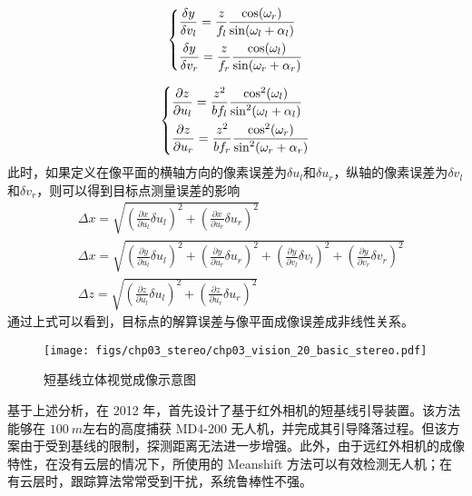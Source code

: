\begin{equation}
\left\{ \begin{gathered}
\frac{{\delta y}}{{\delta {v_l}}} = \frac{z}{{{f_l}}}\frac{{\cos ({\omega _r})}}{{\sin ({\omega _l} + {\alpha _l})}} \hfill \\
\frac{{\delta y}}{{\delta {v_r}}} = \frac{z}{{{f_r}}}\frac{{\cos ({\omega _l})}}{{\sin ({\omega _r} + {\alpha _r})}} \hfill \\ 
\end{gathered}  \right.
\end{equation}


\begin{equation}
\left\{ \begin{gathered}
\frac{{\partial z}}{{\partial {u_l}}} = \frac{{{z^2}}}{{b{f_l}}}\frac{{{{\cos }^2}({\omega _l})}}{{{{\sin }^2}({\omega _l} + {\alpha _l})}} \hfill \\
\frac{{\partial z}}{{\partial {u_r}}} = \frac{{{z^2}}}{{b{f_r}}}\frac{{{{\cos }^2}({\omega _r})}}{{{{\sin }^2}({\omega _r} + {\alpha _r})}} \hfill \\ 
\end{gathered}  \right.
\end{equation}
此时，如果定义在像平面的横轴方向的像素误差为$\delta u_l$和$\delta u_r$，纵轴的像素误差为$\delta v_l$和$\delta v_r$，则可以得到目标点测量误差的影响
\begin{align}
&\Delta x = \sqrt{(\frac{\partial x}{\partial u_l} \delta u_l)^2+(\frac{\partial x}{\partial u_r} \delta u_r)^2} \\
&\Delta x = \sqrt{(\frac{\partial y}{\partial u_l} \delta u_l)^2+(\frac{\partial y}{\partial u_r} \delta u_r)^2+(\frac{\partial y}{\partial v_l} \delta v_l)^2+(\frac{\partial y}{\partial v_r} \delta v_r)^2}\\
&\Delta z = \sqrt{(\frac{\partial z}{\partial u_l} \delta u_l)^2+(\frac{\partial z}{\partial u_r} \delta u_r)^2}
\end{align}
通过上式可以看到，目标点的解算误差与像平面成像误差成非线性关系。

\begin{figure}[!tb]
	\centering
	\texttt{[image: figs/chp03\_stereo/chp03\_vision\_20\_basic\_stereo.pdf]}	
	\caption{短基线立体视觉成像示意图}
	\label{fig:chp03_vision_20_basic_stereo}
\end{figure}

基于上述分析，在 2012 年，首先设计了基于红外相机的短基线引导装置。该方法能够在 $100\ m$左右的高度捕获 MD4-200 无人机，并完成其引导降落过程。但该方案由于受到基线的限制，探测距离无法进一步增强。此外，由于远红外相机的成像特性，在没有云层的情况下，所使用的 Meanshift 方法可以有效检测无人机；在有云层时，跟踪算法常常受到干扰，系统鲁棒性不强。


